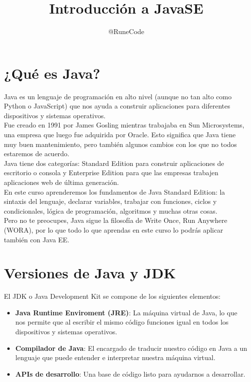 \documentclass{article}
\title{Introducción a JavaSE}
\author{@RuneCode}
\begin{document}


\section{¿Qué es Java?}%
Java es un lenguaje de programación en alto nivel (aunque no tan alto como
Python o JavaScript) que nos ayuda a construir aplicaciones para diferentes
dispositivos y sistemas operativos.\\

Fue creado en 1991 por James Gosling mientras trabajaba en Sun Microsystems,
una empresa que luego fue adquirida por Oracle. Esto significa que Java tiene
muy buen mantenimiento, pero también algunos cambios con los que no todos
estaremos de acuerdo.\\

Java tiene dos categorías: Standard Edition para construir aplicaciones de
escritorio o consola y Enterprise Edition para que las empresas trabajen
aplicaciones web de última generación.\\

En este curso aprenderemos los fundamentos de Java Standard Edition: la
sintaxis del lenguaje, declarar variables, trabajar con funciones, ciclos y
condicionales, lógica de programación, algoritmos y muchas otras cosas.\\

Pero no te preocupes, Java sigue la filosofía de Write Once, Run Anywhere
(WORA), por lo que todo lo que aprendas en este curso lo podrás aplicar también
con Java EE.\\


\section{Versiones de Java y JDK}%
El JDK o Java Development Kit se compone de los siguientes elementos:
\begin{itemize}
  \item \textbf{Java Runtime Enviroment (JRE)}: La máquina virtual de Java, lo
    que nos permite que al escribir el mismo código funciones igual en todos
    los dispositivos y sistemas operativos.
  \item \textbf{Compilador de Java}: El encargado de traducir nuestro código en
    Java a un lenguaje que puede entender e interpretar nuestra máquina
    virtual.
  \item \textbf{APIs de desarrollo}: Una base de código listo para ayudarnos a
    desarrollar.
\end{itemize}
\end{document}
